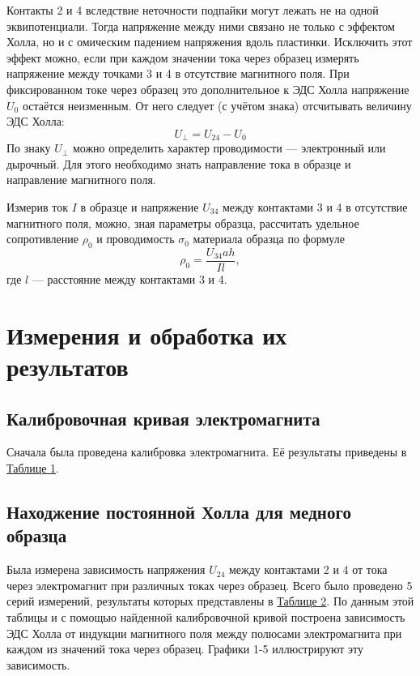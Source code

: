 \documentclass[15pt,a5paper,reqno]{article}
\begin{document}
    Контакты 2 и 4 вследствие неточности подпайки могут лежать не на одной эквипотенциали. Тогда напряжение между ними связано не только с эффектом Холла, но и с омическим падением напряжения вдоль пластинки. Исключить этот эффект можно, если при каждом значении тока через образец измерять напряжение между точками 3 и 4 в отсутствие магнитного поля. При фиксированном токе через образец это дополнительное к ЭДС Холла напряжение $U_0$ остаётся неизменным. От него следует (с учётом знака) отсчитывать величину ЭДС Холла:
    \begin{equation*}
        U_{\perp} = U_{24} - U_0
    \end{equation*}
    По знаку $U_{\perp}$ можно определить характер проводимости — электронный или дырочный. Для этого необходимо знать направление тока в образце и направление магнитного поля.

    Измерив ток $I$ в образце и напряжение $U_{34}$ между контактами 3 и 4
    в отсутствие магнитного поля, можно, зная параметры образца, рассчитать удельное сопротивление $\rho_0$ и проводимость $\sigma_0$ материала образца по формуле
    \begin{equation}\label{rho}
        \boxed{\rho_0 = \frac{U_{34}ah}{Il}},
    \end{equation}
    где $l$ — расстояние между контактами 3 и 4.

\section{Измерения и обработка их результатов}

    \subsection{Калибровочная кривая электромагнита}
        Сначала была проведена калибровка электромагнита. Её результаты приведены в \hyperlink{table_1}{Таблице 1}.

    \subsection{Находжение постоянной Холла для медного образца}
        Была измерена зависимость напряжения $U_{24}$ между контактами 2 и 4 от тока через электромагнит при различных токах через образец. Всего было проведено 5 серий измерений, результаты которых представлены в \hyperlink{table_2}{Таблице 2}. По данным этой таблицы и с помощью найденной калибровочной кривой построена зависимость ЭДС Холла от индукции магнитного поля между полюсами электромагнита при каждом из значений тока через образец. Графики 1-5 иллюстрируют эту зависимость.
\end{document}
